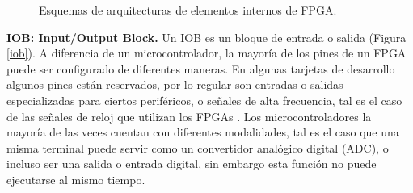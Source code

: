 \documentclass[twoside,spanish,ESP,MSc]{plantillaLabUPV}
\theoremstyle{definition}
\newcommand{\f}{FPGA }
\newcommand{\fs}{FPGAs }
\begin{document}
\begin{figure}
	 \hspace{5mm}
	\caption{Esquemas de arquitecturas de elementos internos de FPGA.}
	\label{efepe}
\end{figure}


\checkmark\textbf{IOB: Input/Output Block.} Un IOB es un bloque de entrada o salida (Figura \ref{iob}). A diferencia de un microcontrolador, la mayoría de los pines de un \f puede ser configurado de diferentes maneras. En algunas tarjetas de desarrollo algunos pines están reservados, por lo regular son entradas o salidas especializadas para ciertos periféricos, o señales de alta frecuencia, tal es el caso de las señales de reloj que utilizan los \fs. Los microcontroladores la mayoría de las veces cuentan con diferentes modalidades, tal es el caso que una misma terminal puede servir como un convertidor analógico digital (ADC), o incluso ser una salida o entrada digital, sin embargo esta función no puede ejecutarse al mismo tiempo.
\end{document}
